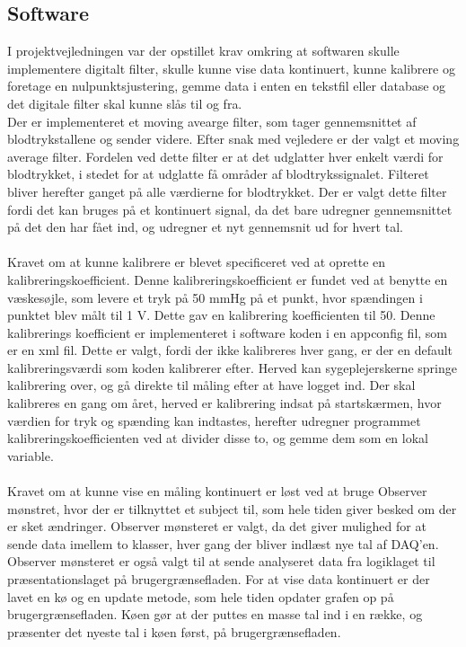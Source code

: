 \subsection{Software}
I projektvejledningen var der opstillet krav omkring at softwaren skulle implementere digitalt filter, skulle kunne vise data kontinuert, kunne kalibrere og foretage en nulpunktsjustering, gemme data i enten en tekstfil eller database og det digitale filter skal kunne slås til og fra. \\
Der er implementeret et moving avearge filter, som tager gennemsnittet af blodtrykstallene og sender videre. Efter snak med vejledere er der valgt et moving average filter. Fordelen ved dette filter er at det udglatter hver enkelt værdi for blodtrykket, i stedet for at udglatte få områder af blodtrykssignalet. Filteret bliver herefter ganget på alle værdierne for blodtrykket. Der er valgt dette filter fordi det kan bruges på et kontinuert signal, da det bare udregner gennemsnittet på det den har fået ind, og udregner et nyt gennemsnit ud for hvert tal. \\\\
Kravet om at kunne kalibrere er blevet specificeret ved at oprette en kalibreringskoefficient. Denne kalibreringskoefficient er fundet ved at benytte en væskesøjle, som levere et tryk på 50 mmHg på et punkt, hvor spændingen i punktet blev målt til 1 V. Dette gav en kalibrering koefficienten til 50. Denne kalibrerings koefficient er implementeret i software koden i en appconfig fil, som er en xml fil. Dette er valgt, fordi der ikke kalibreres hver gang, er der en default kalibreringsværdi som koden kalibrerer efter. Herved kan sygeplejerskerne springe kalibrering over, og gå direkte til måling efter at have logget ind. Der skal kalibreres en gang om året, herved er kalibrering indsat på startskærmen, hvor værdien for tryk og spænding kan indtastes, herefter udregner programmet kalibreringskoefficienten ved at divider disse to, og gemme dem som en lokal variable. \\\\
Kravet om at kunne vise en måling kontinuert er løst ved at bruge Observer mønstret, hvor der er tilknyttet et subject til, som hele tiden giver besked om der er sket ændringer.  Observer mønsteret er valgt, da det giver mulighed for at sende data imellem to klasser, hver gang der bliver indlæst nye tal af DAQ’en. Observer mønsteret er også valgt til at sende analyseret data fra logiklaget til præsentationslaget på brugergrænsefladen. For at vise data kontinuert er der lavet en kø og en update metode, som hele tiden opdater grafen op på brugergrænsefladen. Køen gør at der puttes en masse tal ind i en række, og præsenter det nyeste tal i køen først, på brugergrænsefladen. \\\\
